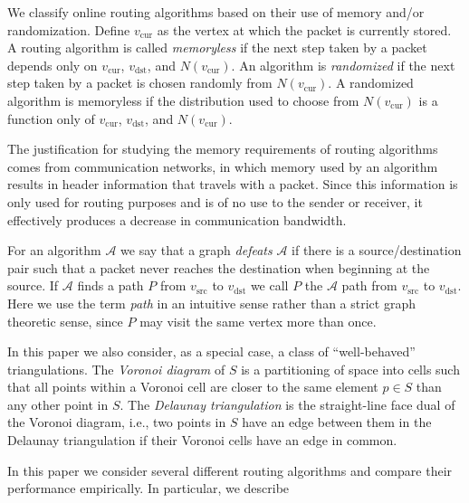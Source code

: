 \documentclass[final]{siamltex}
\newcommand{\vsrc}{v_\mathrm{src}}
\newcommand{\vdest}{v_\mathrm{dst}}
\newcommand{\vcur}{v_\mathrm{cur}}
\newcommand{\neigb}[1]{\mathit{N(#1)}}
\begin{document}
We classify online routing algorithms based on their use of memory
and/or randomization.  Define $\vcur$ as the vertex at which the
packet is currently stored. A routing algorithm is called {\em
memoryless\/} if the next step taken by a packet depends only on
$\vcur$, $\vdest$, and $\neigb{\vcur}$.  An algorithm is {\em
randomized\/} if the next step taken by a packet is chosen randomly from
$\neigb{\vcur}$.  A randomized algorithm is memoryless if the
distribution used to choose from $\neigb{\vcur}$ is a function only of
$\vcur$, $\vdest$, and $\neigb{\vcur}$.

The justification for studying the memory requirements of routing
algorithms comes from communication networks, in which memory used by
an algorithm results in header information that travels with a packet.
Since this information is only used for routing purposes and is of no
use to the sender or receiver, it effectively produces a decrease in
communication bandwidth.

For an algorithm $\mathcal{A}$ we say that a graph {\em defeats\/}
$\mathcal{A}$ if there is a source/destination pair such that a packet
never reaches the destination when beginning at the source.  If
$\mathcal{A}$ finds a path $P$ from $\vsrc$ to $\vdest$ we call $P$
the $\mathcal{A}$ path from $\vsrc$ to $\vdest$. Here we use the term
{\em path\/} in an intuitive sense rather than a strict graph theoretic
sense, since $P$ may visit the same vertex more than once.

In this paper we also consider, as a special case, a class of
``well-behaved'' triangulations.  The {\em Voronoi diagram\/}
\cite{obs92} of $S$ is a partitioning of space into cells such that
all points within a Voronoi cell are closer to the same element $p\in
S$ than any other point in $S$.  The {\em Delaunay triangulation\/} is
the straight-line face dual of the Voronoi diagram, i.e., two points
in $S$ have an edge between them in the Delaunay triangulation if
their Voronoi cells have an edge in common.

In this paper we consider several different routing algorithms and
compare their performance empirically.  In particular, we describe
\end{document}
